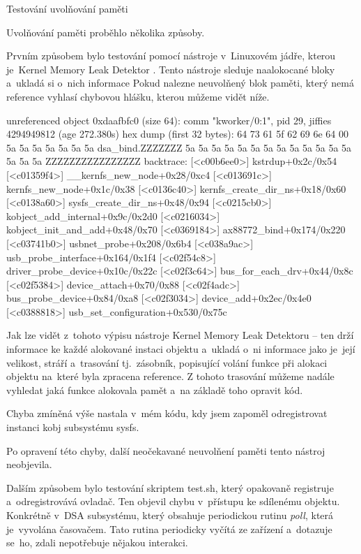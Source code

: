 \sec Testování uvolňování paměti

Uvolňování paměti proběhlo několika způsoby.

Prvním způsobem bylo testování pomocí nástroje v~Linuxovém jádře, kterou je~Kernel Memory Leak Detektor
.
Tento nástroje sleduje naalokocané bloky a~ukladá si o~nich informace
Pokud nalezne neuvolňený blok paměti, který nemá reference vyhlasí chybovou hlášku, kterou můžeme vidět níže.

\begtt
unreferenced object 0xdaafbfc0 (size 64):
  comm "kworker/0:1", pid 29, jiffies 4294949812 (age 272.380s)
  hex dump (first 32 bytes):
    64 73 61 5f 62 69 6e 64 00 5a 5a 5a 5a 5a 5a 5a  dsa_bind.ZZZZZZZ
    5a 5a 5a 5a 5a 5a 5a 5a 5a 5a 5a 5a 5a 5a 5a 5a  ZZZZZZZZZZZZZZZZ
  backtrace:
    [<c00b6ee0>] kstrdup+0x2c/0x54
    [<c01359f4>] __kernfs_new_node+0x28/0xc4
    [<c013691c>] kernfs_new_node+0x1c/0x38
    [<c0136c40>] kernfs_create_dir_ns+0x18/0x60
    [<c0138a60>] sysfs_create_dir_ns+0x48/0x94
    [<c0215cb0>] kobject_add_internal+0x9c/0x2d0
    [<c0216034>] kobject_init_and_add+0x48/0x70
    [<c0369184>] ax88772_bind+0x174/0x220
    [<c03741b0>] usbnet_probe+0x208/0x6b4
    [<c038a9ac>] usb_probe_interface+0x164/0x1f4
    [<c02f54c8>] driver_probe_device+0x10c/0x22c
    [<c02f3c64>] bus_for_each_drv+0x44/0x8c
    [<c02f5384>] device_attach+0x70/0x88
    [<c02f4adc>] bus_probe_device+0x84/0xa8
    [<c02f3034>] device_add+0x2ec/0x4e0
    [<c0388818>] usb_set_configuration+0x530/0x75c
\endtt

Jak lze vidět z~tohoto výpisu nástroje Kernel Memory Leak Detektoru -- ten drží informace ke každé alokované instaci objektu a~ukladá o~ni informace jako je~její velikost, stráří a~trasování tj.~zásobník, popisující volání funkce při alokaci objektu na~které byla zpracena reference.
Z tohoto trasování můžeme nadále vyhledat jaká funkce alokovala pamět a~na základě toho opravit kód.

Chyba zmíněná výše nastala v~mém kódu, kdy jsem zapoměl odregistrovat instanci kobj subsystému sysfs.

Po opravení této chyby, další neočekavané neuvolňení paměti tento nástroj neobjevila.

Dalším způsobem bylo testování skriptem test.sh, který opakovaně registruje a~odregistrovává ovladač.
Ten objevil chybu v~přístupu ke sdílenému objektu.
Konkrétně v~DSA subsystému, který obsahuje periodickou rutinu {\em poll}, která je~vyvolána časovačem.
Tato rutina periodicky vyčítá ze zařízení a~dotazuje se~ho, zdali nepotřebuje nějakou interakci.

